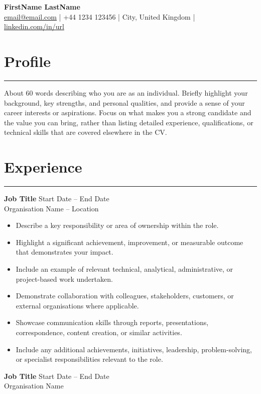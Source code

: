 \documentclass[12pt,a4paper]{report}
\newcommand{\resumeItem}[1]{\item #1}
\newcommand{\resumeSection}[1]{\section*{\Large\bfseries #1}\vspace{-0.5em}\hrule\vspace{0.2em}}
\begin{document}
\begin{center}
	{\Huge \textbf{FirstName LastName}}\\
	\vspace{4pt}
	\href{mailto:email@email.com}{email@email.com} \;|\;
	+44 1234 123456 \;|\;
	City, United Kingdom \;|\;
	\href{https://www.linkedin.com/in/url}{linkedin.com/in/url}
\end{center}

\resumeSection{Profile}
About 60 words describing who you are as an individual. Briefly highlight your
background, key strengths, and personal qualities, and provide a sense of your
career interests or aspirations. Focus on what makes you a strong candidate and
the value you can bring, rather than listing detailed experience, qualifications, or
technical skills that are covered elsewhere in the CV.

\resumeSection{Experience}
\textbf{Job Title} \hfill Start Date -- End Date\\
Organisation Name -- Location\\

\begin{itemize}[leftmargin=*]
    \resumeItem{Describe a key responsibility or area of ownership within the role.}
    
    \resumeItem{Highlight a significant achievement, improvement, or measurable outcome
    that demonstrates your impact.}
    
    \resumeItem{Include an example of relevant technical, analytical, administrative,
    or project-based work undertaken.}
    
    \resumeItem{Demonstrate collaboration with colleagues, stakeholders, customers,
    or external organisations where applicable.}
    
    \resumeItem{Showcase communication skills through reports, presentations,
    correspondence, content creation, or similar activities.}
    
    \resumeItem{Include any additional achievements, initiatives, leadership,
    problem-solving, or specialist responsibilities relevant to the role.}
\end{itemize}

\vspace{1em}

\textbf{Job Title} \hfill Start Date -- End Date\\
Organisation Name\\
\end{document}
